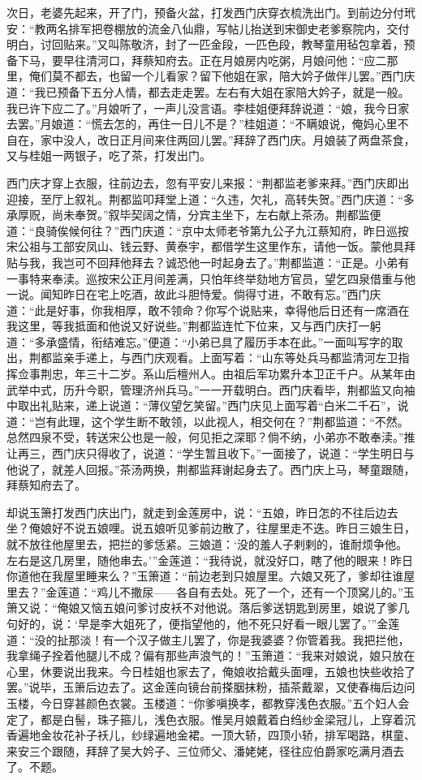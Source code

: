 次日，老婆先起来，开了门，预备火盆，打发西门庆穿衣梳洗出门。到前边分付玳安：“教两名排军把卷棚放的流金八仙鼎，写帖儿抬送到宋御史老爹察院内，交付明白，讨回贴来。”又叫陈敬济，封了一匹金段，一匹色段，教琴童用毡包拿着，预备下马，要早往清河口，拜蔡知府去。正在月娘房内吃粥，月娘问他：“应二那里，俺们莫不都去，也留一个儿看家？留下他姐在家，陪大妗子做伴儿罢。”西门庆道：“我已预备下五分人情，都去走走罢。左右有大姐在家陪大妗子，就是一般。我已许下应二了。”月娘听了，一声儿没言语。李桂姐便拜辞说道：“娘，我今日家去罢。”月娘道：“慌去怎的，再住一日儿不是？”桂姐道：“不瞒娘说，俺妈心里不自在，家中没人，改日正月间来住两回儿罢。”拜辞了西门庆。月娘装了两盘茶食，又与桂姐一两银子，吃了茶，打发出门。

西门庆才穿上衣服，往前边去，忽有平安儿来报：“荆都监老爹来拜。”西门庆即出迎接，至厅上叙礼。荆都监叩拜堂上道：“久违，欠礼，高转失贺。”西门庆道：“多承厚贶，尚未奉贺。”叙毕契阔之情，分宾主坐下，左右献上茶汤。荆都监便道：“良骑俟候何往？”西门庆道：“京中太师老爷第九公子九江蔡知府，昨日巡按宋公祖与工部安凤山、钱云野、黄泰宇，都借学生这里作东，请他一饭。蒙他具拜贴与我，我岂可不回拜他拜去？诚恐他一时起身去了。”荆都监道：“正是。小弟有一事特来奉渎。巡按宋公正月间差满，只怕年终举劾地方官员，望乞四泉借重与他一说。闻知昨日在宅上吃酒，故此斗胆恃爱。倘得寸进，不敢有忘。”西门庆道：“此是好事，你我相厚，敢不领命？你写个说贴来，幸得他后日还有一席酒在我这里，等我抵面和他说又好说些。”荆都监连忙下位来，又与西门庆打一躬道：“多承盛情，衔结难忘。”便道：“小弟已具了履历手本在此。”一面叫写字的取出，荆都监亲手递上，与西门庆观看。上面写着：“山东等处兵马都监清河左卫指挥佥事荆忠，年三十二岁。系山后檀州人。由祖后军功累升本卫正千户。从某年由武举中式，历升今职，管理济州兵马。”一一开载明白。西门庆看毕，荆都监又向袖中取出礼贴来，递上说道：“薄仪望乞笑留。”西门庆见上面写着“白米二千石”，说道：“岂有此理，这个学生断不敢领，以此视人，相交何在？”荆都监道：“不然。总然四泉不受，转送宋公也是一般，何见拒之深耶？倘不纳，小弟亦不敢奉渎。”推让再三，西门庆只得收了，说道：“学生暂且收下。”一面接了，说道：“学生明日与他说了，就差人回报。”茶汤两换，荆都监拜谢起身去了。西门庆上马，琴童跟随，拜蔡知府去了。

却说玉箫打发西门庆出门，就走到金莲房中，说：“五娘，昨日怎的不往后边去坐？俺娘好不说五娘哩。说五娘听见爹前边散了，往屋里走不迭。昨日三娘生日，就不放往他屋里去，把拦的爹恁紧。三娘道：‘没的羞人子剌剌的，谁耐烦争他。左右是这几房里，随他串去。’”金莲道：“我待说，就没好口，瞎了他的眼来！昨日你道他在我屋里睡来么？”玉箫道：“前边老到只娘屋里。六娘又死了，爹却往谁屋里去？”金莲道：“鸡儿不撒尿——各自有去处。死了一个，还有一个顶窝儿的。”玉箫又说：“俺娘又恼五娘问爹讨皮袄不对他说。落后爹送钥匙到房里，娘说了爹几句好的，说：‘早是李大姐死了，便指望他的，他不死只好看一眼儿罢了。’”金莲道：“没的扯那淡！有一个汉子做主儿罢了，你是我婆婆？你管着我。我把拦他，我拿绳子拴着他腿儿不成？偏有那些声浪气的！”玉箫道：“我来对娘说，娘只放在心里，休要说出我来。今日桂姐也家去了，俺娘收拾戴头面哩，五娘也快些收拾了罢。”说毕，玉箫后边去了。这金莲向镜台前搽胭抹粉，插茶戴翠，又使春梅后边问玉楼，今日穿甚颜色衣裳。玉楼道：“你爹嗔换孝，都教穿浅色衣服。”五个妇人会定了，都是白髻，珠子箍儿，浅色衣服。惟吴月娘戴着白绉纱金梁冠儿，上穿着沉香遍地金妆花补子袄儿，纱绿遍地金裙。一顶大轿，四顶小轿，排军喝路，棋童、来安三个跟随，拜辞了吴大妗子、三位师父、潘姥姥，径往应伯爵家吃满月酒去了。不题。

